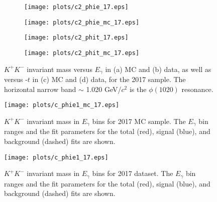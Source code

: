 \begin{center}
\null
\vfill
\begin{figure}[htbp]
    \centering
    \begin{subfigure}[b]{0.5\textwidth}
        \texttt{[image: plots/c2\_phie\_17.eps]}
        \caption{}
        \label{fig.y2175.xsec_ul.phi2pi.2.a}
    \end{subfigure}\hfill
    \begin{subfigure}[b]{0.5\textwidth}
        \texttt{[image: plots/c2\_phie\_mc\_17.eps]}
        \caption{}
        \label{fig.y2175.xsec_ul.phi2pi.2.b}
    \end{subfigure}
    \begin{subfigure}[b]{0.5\textwidth}
        \texttt{[image: plots/c2\_phit\_17.eps]}
        \caption{}
        \label{fig.y2175.xsec_ul.phi2pi.2.c}
    \end{subfigure}\hfill
    \begin{subfigure}[b]{0.5\textwidth}
        \texttt{[image: plots/c2\_phit\_mc\_17.eps]}
        \caption{}
        \label{fig.y2175.xsec_ul.phi2pi.2.d}
    \end{subfigure}
    \caption{\label{fig.y2175.xsec_ul.phi2pi.2}$K^{+}K^{-}$ invariant mass versus $E_{\gamma}$ in (a) MC and (b) data, as well as versus -$t$ in (c) MC and (d) data, for the 2017 sample. The horizontal narrow band $\sim$ 1.020 GeV/$c^2$ is the $\phi(1020)$ resonance.}
\end{figure}
\null
\vfill
\end{center}

\begin{figure}[H]
    \centering
    \texttt{[image: plots/c\_phie1\_mc\_17.eps]}
    \caption{\label{fig.y2175.xsec_ul.phi2pi.3}$K^{+}K^{-}$ invariant mass in $E_{\gamma}$ bins for 2017 MC sample. The $E_{\gamma}$ bin ranges and the fit parameters for the total (red), signal (blue), and background (dashed) fits are shown.}
\end{figure}

\begin{figure}[H]
    \centering
    \texttt{[image: plots/c\_phie1\_17.eps]}
    \caption{\label{fig.y2175.xsec_ul.phi2pi.4}$K^{+}K^{-}$ invariant mass in $E_{\gamma}$ bins for 2017 dataset. The $E_{\gamma}$ bin ranges and the fit parameters for the total (red), signal (blue), and background (dashed) fits are shown.}
\end{figure}

